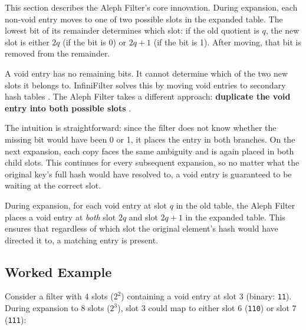 This section describes the Aleph Filter's core innovation. During 
expansion, each non-void entry moves to one of two possible slots in 
the expanded table. The lowest bit of its remainder determines which 
slot: if the old quotient is $q$, the new slot is either $2q$ (if the 
bit is 0) or $2q + 1$ (if the bit is 1). After moving, that bit is 
removed from the remainder.

A void entry has no remaining bits. It cannot determine which of the 
two new slots it belongs to. InfiniFilter solves this by moving void 
entries to secondary hash tables \cite{infinifilter}. The Aleph Filter 
takes a different approach: \textbf{duplicate the void entry into both 
possible slots} \cite{aleph}.

The intuition is straightforward: since the filter does not know 
whether the missing bit would have been 0 or 1, it places the entry 
in both branches. On the next expansion, each copy faces the same 
ambiguity and is again placed in both child slots. This continues for 
every subsequent expansion, so no matter what the original key's full 
hash would have resolved to, a void entry is guaranteed to be waiting 
at the correct slot.

\begin{definitionbox}
During expansion, for each void entry at slot $q$ in the old table, 
the Aleph Filter places a void entry at \emph{both} slot $2q$ and 
slot $2q + 1$ in the expanded table. This ensures that regardless of 
which slot the original element's hash would have directed it to, a 
matching entry is present.
\end{definitionbox}

\subsection{Worked Example}

Consider a filter with 4 slots ($2^2$) containing a void entry at 
slot 3 (binary: \texttt{11}). During expansion to 8 slots ($2^3$), 
slot 3 could map to either slot 6 (\texttt{110}) or slot 7 
(\texttt{111}):

